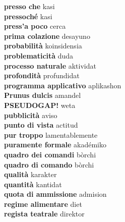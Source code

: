 \textbf{ presso che  } kasi \\
\textbf{ pressoché  } kasi \\
\textbf{ press’a poco  } cerca \\
\textbf{ prima colazione  } desayuno \\
\textbf{ probabilità  } koinsidensia \\
\textbf{ problematicità  } duda \\
\textbf{ processo naturale  } aktividat \\
\textbf{ profondità  } profundidat \\
\textbf{ programma applicativo  } aplikashon \\
\textbf{ Prunus dulcis  } amandel \\
\textbf{ PSEUDOGAP!  } weta \\
\textbf{ pubblicità  } aviso \\
\textbf{ punto di vista  } actitud \\
\textbf{ pur troppo  } lamentablemente \\
\textbf{ puramente formale  } akadémiko \\
\textbf{ quadro dei comandi  } bòrchi \\
\textbf{ quadro di comando  } bòrchi \\
\textbf{ qualità  } karakter \\
\textbf{ quantità  } kantidat \\
\textbf{ quota di ammissione  } admision \\
\textbf{ regime alimentare  } diet \\
\textbf{ regista teatrale  } direktor \\

